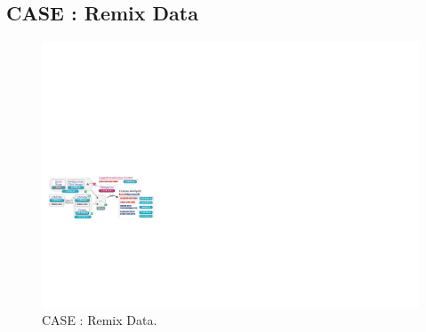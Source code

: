 

\subsection{CASE  : Remix Data}

\begin{figure}[h]
    \centering
    \includegraphics[width=\linewidth]{fig/case5.pdf}
    \caption{CASE : Remix Data.}
    \Description{}
    \label{fig:case5}
\end{figure}


